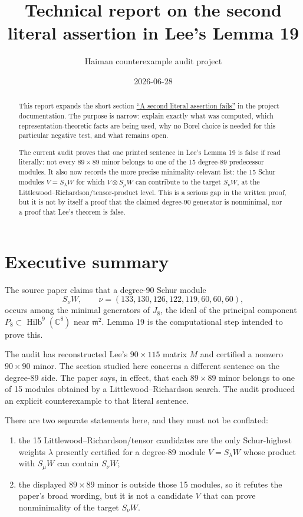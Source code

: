 \documentclass[11pt]{article}
\title{Technical report on the second literal assertion in Lee's Lemma 19}
\author{Haiman counterexample audit project}
\date{2026-06-28}
\newcommand{\Hilb}{\operatorname{Hilb}}
\begin{document}
\maketitle

\begin{abstract}
This report expands the short section
\href{https://nasqret.github.io/haiman-counterexample-audit/chapters/lemma19.html#a-second-literal-assertion-fails}{``A second literal assertion fails''}
in the project documentation.  The purpose is narrow: explain exactly what was
computed, which representation-theoretic facts are being used, why no Borel
choice is needed for this particular negative test, and what remains open.

The current audit proves that one printed sentence in Lee's Lemma 19 is false
if read literally: not every \(89\times 89\) minor belongs to one of the 15
degree-89 predecessor modules.  It also now records the more precise
minimality-relevant list: the 15 Schur modules \(V=S_\lambda W\) for which
\(V\otimes S_\mu W\) can contribute to the target \(S_\nu W\), at the
Littlewood--Richardson/tensor-product level.  This is a serious gap in the
written proof, but it is not by itself a proof that the claimed degree-90
generator is nonminimal, nor a proof that Lee's theorem is false.
\end{abstract}

\section{Executive summary}

The source paper claims that a degree-90 Schur module
\[
  S_\nu W,\qquad
  \nu=(133,130,126,122,119,60,60,60),
\]
occurs among the minimal generators of \(J_8\), the ideal of the principal
component \(P_8 \subset \Hilb^9(\mathbb C^8)\) near \(\mathfrak m^2\).  Lemma 19
is the computational step intended to prove this.

The audit has reconstructed Lee's \(90\times115\) matrix \(M\) and certified a
nonzero \(90\times90\) minor.  The section studied here concerns a different
sentence on the degree-89 side.  The paper says, in effect, that each
\(89\times89\) minor belongs to one of 15 modules obtained by a
Littlewood--Richardson search.  The audit produced an explicit counterexample
to that literal sentence.

There are two separate statements here, and they must not be conflated:
\begin{enumerate}
  \item the 15 Littlewood--Richardson/tensor candidates are the only
  Schur-highest weights \(\lambda\) presently certified for a degree-89
  module \(V=S_\lambda W\) whose product with \(S_\mu W\) can contain
  \(S_\nu W\);
  \item the displayed \(89\times89\) minor is outside those 15 modules, so it
  refutes the paper's broad wording, but it is not a candidate \(V\) that can
  prove nonminimality of the target \(S_\nu W\).
\end{enumerate}
\end{document}
